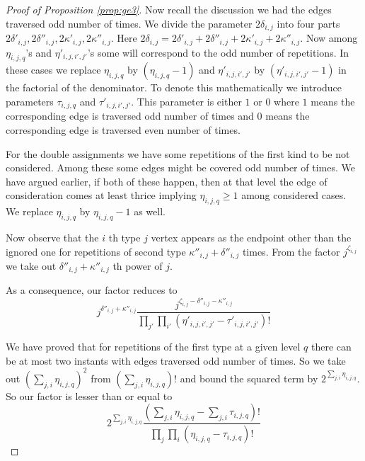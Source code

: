 \documentclass[12pt]{article}
\numberwithin{equation}{section}
\numberwithin{equation}{section}
\theoremstyle{definition}
\renewcommand{\1}{\bf 1}
\begin{document}
\begin{proof}[Proof of Proposition \ref{prop:ge3}]
Now recall the discussion we had the edges traversed odd number of times. We divide the parameter $2\delta_{i,j}$ into four parts $2\delta'_{i,j},2\delta''_{i,j},2\kappa'_{i,j},2\kappa''_{i,j}$. Here $2\delta_{i,j}= 2\delta'_{i,j}+2\delta''_{i,j}+2\kappa'_{i,j}+2\kappa''_{i,j}$. Now among $\eta_{i,j,q}$'s and $\eta'_{i,j,i',j'}$'s some will correspond to the odd number of repetitions. In these cases we replace $\eta_{i,j,q}$ by $(\eta_{i,j,q}-1)$ and $\eta'_{i,j,i',j'}$ by $(\eta'_{i,j,i',j'}-1)$ in the factorial of the denominator. To denote this mathematically we introduce parameters $\tau_{i,j,q}$ and $\tau'_{i,j,i',j'}$. This parameter is either $1$ or $0$ where $1$ means the corresponding edge is traversed odd number of times and $0$ means the corresponding edge is traversed even number of times. 

For the double assignments we have some repetitions of the first kind to be not considered. Among these some edges might be covered odd number of times. We have argued earlier, if both of these happen, then at that level the edge of consideration comes at least thrice implying $\eta_{i,j,q}\ge 1$ among considered cases. We replace $\eta_{i,j,q}$ by $\eta_{i,j,q}-1$ as well. 

Now observe that the $i$ th type $j$ vertex appears as the endpoint other than the ignored one for repetitions of second type $\kappa''_{i,j}+ \delta''_{i,j}$ times. From the factor $j^{\zeta_{i,j}}$ we take out $\delta''_{i,j}+\kappa''_{i,j}$ th power of $j$.

As a consequence, our factor reduces to 
\begin{equation}\label{1}
j^{\delta''_{i,j}+\kappa''_{i,j}}\frac{j^{\zeta_{i,j}-\delta''_{i,j}-\kappa''_{i,j}}}{\prod_{j'}\prod_{i'} \left(\eta'_{i,j,i',j'}-\tau'_{i,j,i',j'}\right)!}
\end{equation} 

We have proved that for repetitions of the first type at a given level $q$ there can be at most two instants with edges traversed odd number of times. So we take out $\left(\sum_{j,i}\eta_{i,j,q}\right)^2$ from $\left(  \sum_{j,i}\eta_{i,j,q}\right)!$ and bound the squared term by $2^{\sum_{j,i}\eta_{i,j,q}}$. So our factor is lesser than or equal to 
\begin{equation}\label{2}
2^{\sum_{j,i}\eta_{i,j,q}} \frac{(\sum_{j,i}\eta_{i,j,q}-\sum_{j,i}\tau_{i,j,q})!}{\prod_{j}\prod_{i}\left(\eta_{i,j,q}-\tau_{i,j,q}\right)!}
\end{equation}



\end{proof}
\end{document}
